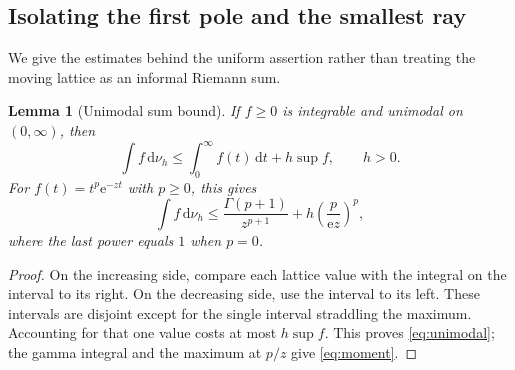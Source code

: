 \documentclass[11pt,a4paper]{article}
\numberwithin{equation}{section}
\newtheorem{lemma}[theorem]{Lemma}
\theoremstyle{definition}\newtheorem{definition}[theorem]{Definition}
\theoremstyle{remark}\newtheorem{remark}[theorem]{Remark}
\newcommand{\e}{\mathrm e}
\newcommand{\dd}{\,\mathrm d}
\begin{document}
\subsection{Isolating the first pole and the smallest ray}
We give the estimates behind the uniform assertion rather than treating
the moving lattice as an informal Riemann sum.

\begin{lemma}[Unimodal sum bound]
\label{lem:unimodal}
If $f\ge0$ is integrable and unimodal on $(0,\infty)$, then
\begin{equation}
 \int f\dd\nu_h\le\int_0^\infty f(t)\dd t+h\sup f,
 \qquad h>0.
 \label{eq:unimodal}
\end{equation}
For $f(t)=t^p\e^{-zt}$ with $p\ge0$, this gives
\begin{equation}
 \int f\dd\nu_h\le\frac{\Gamma(p+1)}{z^{p+1}}
                 +h\left(\frac{p}{\e z}\right)^p,
 \label{eq:moment}
\end{equation}
where the last power equals $1$ when $p=0$.
\end{lemma}
\begin{proof}
On the increasing side, compare each lattice value with the integral on
the interval to its right. On the decreasing side, use the interval to
its left. These intervals are disjoint except for the single interval
straddling the maximum. Accounting for that one value costs at most
$h\sup f$. This proves \eqref{eq:unimodal}; the gamma integral and the
maximum at $p/z$ give \eqref{eq:moment}.
\end{proof}
\end{document}
